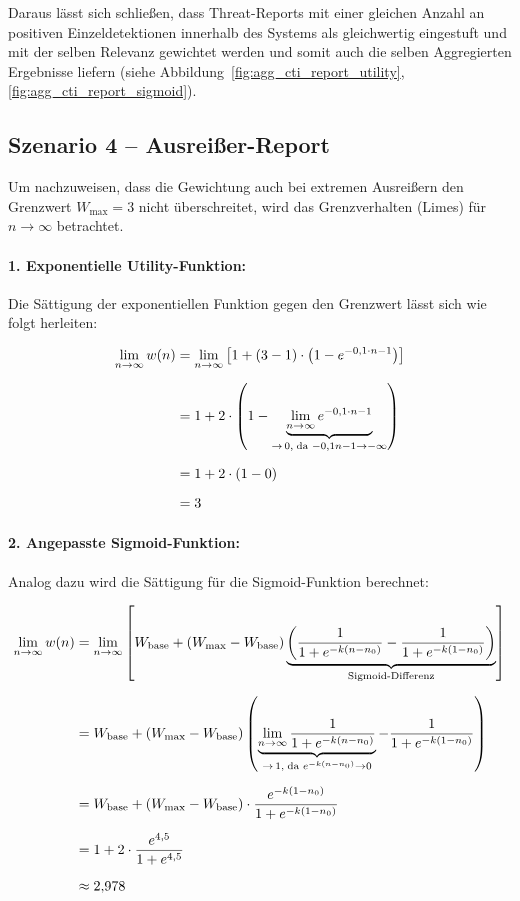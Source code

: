 Daraus lässt sich schließen, dass Threat-Reports mit einer gleichen Anzahl an positiven Einzeldetektionen innerhalb des Systems als gleichwertig eingestuft und mit der selben Relevanz gewichtet werden und somit auch die selben Aggregierten Ergebnisse liefern (siehe Abbildung~\ref{fig:agg_cti_report_utility}, \ref{fig:agg_cti_report_sigmoid}).


\subsection{Szenario 4 – Ausreißer-Report}
\label{subsec:szenario_4}   

Um nachzuweisen, dass die Gewichtung auch bei extremen Ausreißern den Grenzwert $W_{\text{max}} = 3$ nicht überschreitet, wird das Grenzverhalten (Limes) für $n \to \infty$ betrachtet.

\paragraph{1. Exponentielle Utility-Funktion:}
Die Sättigung der exponentiellen Funktion gegen den Grenzwert lässt sich wie folgt herleiten:

\begin{align}
\lim_{n \to \infty} w(n)
&= \lim_{n \to \infty} \left[
    1 + (3 - 1) \cdot \left(1 - e^{-0{,}1 \cdot n - 1}\right)
\right] \notag \\[6pt]
&= 1 + 2 \cdot \left(
    1 - \underbrace{\lim_{n \to \infty} e^{-0{,}1 \cdot n - 1}}_{\to\, 0,\;
    \text{da } {-0{,}1n - 1} \to -\infty}
\right) \notag \\[6pt]
&= 1 + 2 \cdot (1 - 0) \notag \\[6pt]
&= 3 \label{eq:grenzwert}
\end{align}

\paragraph{2. Angepasste Sigmoid-Funktion:}
Analog dazu wird die Sättigung für die Sigmoid-Funktion berechnet:

\begin{align}
\lim_{n \to \infty} w(n)
&= \lim_{n \to \infty} \left[
    W_{\text{base}} + (W_{\text{max}} - W_{\text{base}})
    \underbrace{\left(
        \frac{1}{1+e^{-k(n-n_0)}}
        - \frac{1}{1+e^{-k(1-n_0)}}
    \right)}_{\text{Sigmoid-Differenz}}
\right] \notag \\[6pt]
&= W_{\text{base}} + (W_{\text{max}} - W_{\text{base}})
    \left(
        \underbrace{\lim_{n \to \infty} \frac{1}{1+e^{-k(n-n_0)}}}_{\to\, 1,\; \text{da } e^{-k(n-n_0)} \to 0}
        - \frac{1}{1+e^{-k(1-n_0)}}
    \right) \notag \\[6pt]
&= W_{\text{base}} + (W_{\text{max}} - W_{\text{base}})
    \cdot \frac{e^{-k(1-n_0)}}{1+e^{-k(1-n_0)}} \notag \\[6pt]
&= 1 + 2 \cdot \frac{e^{4{,}5}}{1+e^{4{,}5}} \notag \\[6pt]
&\approx 2{,}978 \label{eq:sigmoid_grenzwert}
\end{align}